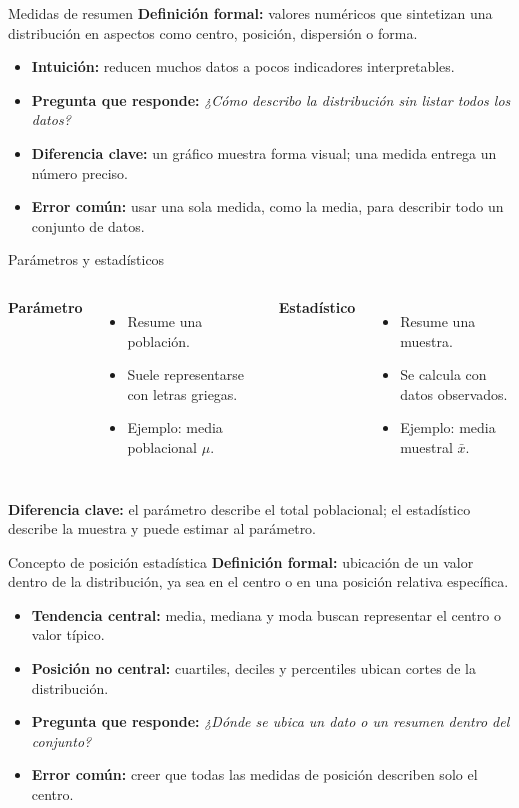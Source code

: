 \documentclass[aspectratio=169,11pt]{beamer}
\newcommand{\pregunta}[1]{\textbf{Pregunta que responde:} \emph{#1}}
\newcommand{\errorcomun}[1]{\textbf{Error común:} #1}
\newcommand{\diferencia}[1]{\textbf{Diferencia clave:} #1}
\begin{document}
\begin{frame}{Medidas de resumen}
\textbf{Definición formal:} valores numéricos que sintetizan una distribución en aspectos como centro, posición, dispersión o forma.
\begin{itemize}
  \item \textbf{Intuición:} reducen muchos datos a pocos indicadores interpretables.
  \item \pregunta{¿Cómo describo la distribución sin listar todos los datos?}
  \item \diferencia{un gráfico muestra forma visual; una medida entrega un número preciso.}
  \item \errorcomun{usar una sola medida, como la media, para describir todo un conjunto de datos.}
\end{itemize}
\end{frame}

\begin{frame}{Parámetros y estadísticos}
\begin{columns}[T]
\textbf{Parámetro}
\begin{itemize}
  \item Resume una población.
  \item Suele representarse con letras griegas.
  \item Ejemplo: media poblacional $\mu$.
\end{itemize}
\textbf{Estadístico}
\begin{itemize}
  \item Resume una muestra.
  \item Se calcula con datos observados.
  \item Ejemplo: media muestral $\bar{x}$.
\end{itemize}
\end{columns}
\vspace{0.4em}
\diferencia{el parámetro describe el total poblacional; el estadístico describe la muestra y puede estimar al parámetro.}
\end{frame}

\begin{frame}{Concepto de posición estadística}
\textbf{Definición formal:} ubicación de un valor dentro de la distribución, ya sea en el centro o en una posición relativa específica.
\begin{itemize}
  \item \textbf{Tendencia central:} media, mediana y moda buscan representar el centro o valor típico.
  \item \textbf{Posición no central:} cuartiles, deciles y percentiles ubican cortes de la distribución.
  \item \pregunta{¿Dónde se ubica un dato o un resumen dentro del conjunto?}
  \item \errorcomun{creer que todas las medidas de posición describen solo el centro.}
\end{itemize}
\end{frame}
\end{document}
